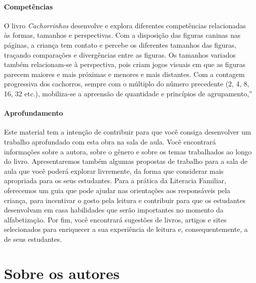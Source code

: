 \documentclass[11pt]{extarticle}
\begin{document}
\paragraph{Competências}
O livro \textit{Cachorrinhos} desenvolve e explora diferentes competências relacionadas às formas, tamanhos e perspectivas. Com a disposição das figuras caninas nas páginas, a criança tem contato e percebe os diferentes tamanhos das figuras, traçando comparações e divergências entre as figuras. Os tamanhos variados também relacionam-se à perspectiva, pois criam jogos visuais em que as figuras parecem maiores e mais próximas e menores e mais distantes. Com a contagem progressiva dos cachorros, sempre com o múltiplo do número precedente (2, 4, 8, 16, 32 etc.), mobiliza-se a apreensão de quantidade e princípios de agrupamento,''


\paragraph{Aprofundamento} Este material tem a 
intenção de contribuir para que você consiga desenvolver um trabalho aprofundado 
com esta obra na sala de aula. Você encontrará informações sobre a autora, sobre 
o gênero e sobre os temas trabalhados ao longo do livro. Apresentaremos também 
algumas propostas de trabalho para a sala de aula que você poderá explorar livremente, 
da forma que considerar mais apropriada para os seus estudantes. Para a prática 
da Literacia Familiar, oferecemos um guia que pode ajudar nas orientações aos 
responsáveis pela criança, para incentivar o gosto pela leitura e contribuir para 
que os estudantes desenvolvam em casa habilidades que serão importantes no momento 
da alfabetização. Por fim, você encontrará sugestões de livros, artigos e sites 
selecionados para enriquecer a sua experiência de leitura e, 
consequentemente, a de seus estudantes.



\section{Sobre os autores}

\end{document}
